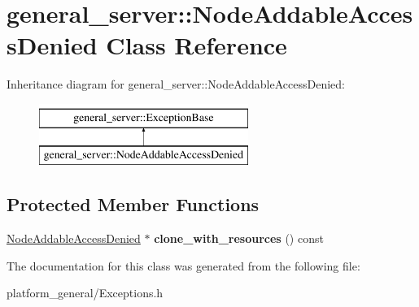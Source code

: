 \hypertarget{classgeneral__server_1_1NodeAddableAccessDenied}{\section{general\-\_\-server\-:\-:\-Node\-Addable\-Access\-Denied \-Class \-Reference}
\label{classgeneral__server_1_1NodeAddableAccessDenied}
}
\-Inheritance diagram for general\-\_\-server\-:\-:\-Node\-Addable\-Access\-Denied\-:\begin{figure}[H]
\begin{center}
\leavevmode
\includegraphics[height=2.000000cm]{classgeneral__server_1_1NodeAddableAccessDenied}
\end{center}
\end{figure}
\subsection*{\-Protected \-Member \-Functions}
\begin{DoxyCompactItemize}
\item 
\hypertarget{classgeneral__server_1_1NodeAddableAccessDenied_a4cf276b5d97cddf2467bbf4784a56464}{\hyperlink{classgeneral__server_1_1NodeAddableAccessDenied}{\-Node\-Addable\-Access\-Denied} $\ast$ {\bfseries clone\-\_\-with\-\_\-resources} () const }\label{classgeneral__server_1_1NodeAddableAccessDenied_a4cf276b5d97cddf2467bbf4784a56464}

\end{DoxyCompactItemize}


\-The documentation for this class was generated from the following file\-:\begin{DoxyCompactItemize}
\item 
platform\-\_\-general/\-Exceptions.\-h\end{DoxyCompactItemize}
